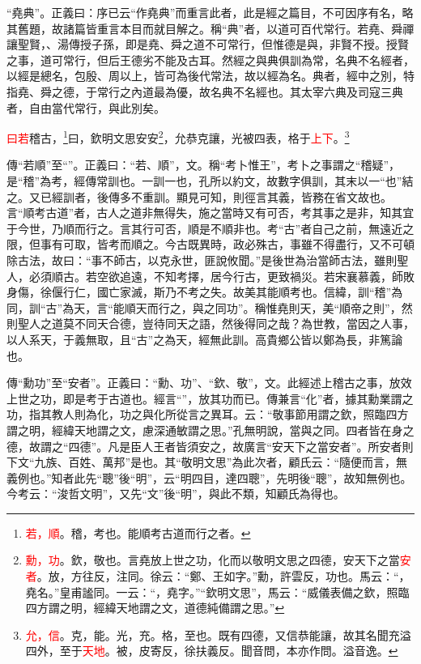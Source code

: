 {\noindent\shu{}\fzkt “堯典”。正義曰：序已云“作堯典”而重言此者，此是經之篇目，不可因序有名，略其舊題，故諸篇皆重言本目而就目解之。稱“典”者，以道可百代常行。若堯、舜禪讓聖賢，、湯傳授子孫，即是堯、舜之道不可常行，但惟德是與，非賢不授。授賢之事，道可常行，但后王德劣不能及古耳。然經之與典俱訓為常，名典不名經者，以經是總名，包殷、周以上，皆可為後代常法，故以經為名。典者，經中之別，特指堯、舜之德，于常行之內道最為優，故名典不名經也。其太宰六典及司寇三典者，自由當代常行，與此別矣。 \par}

\textcolor{red}{曰若}稽古，\footnote{\textcolor{red}{若，順}。稽，考也。能順考古道而行之者\textcolor{red}{}。}曰，欽明文思安安\footnote{\textcolor{red}{勳，功}。欽，敬也。言堯放上世之功，化而以敬明文思之四德，安天下之當\textcolor{red}{安者}。放，方往反，注同。徐云：“鄭、王如字。”勳，許雲反，功也。馬云：“，堯名。”皇甫謐同。一云：“，堯字。”“欽明文思”，馬云：“威儀表備之欽，照臨四方謂之明，經緯天地謂之文，道德純備謂之思。”}，允恭克讓，光被四表，格于\textcolor{red}{上下}。\footnote{\textcolor{red}{允，信}。克，能。光，充。格，至也。既有四德，又信恭能讓，故其名聞充溢四外，至于\textcolor{red}{天地}。被，皮寄反，徐扶義反。聞音問，本亦作問。溢音逸。}

{\noindent\zhuan{}\fzbyks 傳“若順”至“”。正義曰：“若、順”，文。稱“考卜惟王”，考卜之事謂之“稽疑”，是“稽”為考，經傳常訓也。一訓一也，孔所以約文，故數字俱訓，其末以一“也”結之。又已經訓者，後傳多不重訓。顯見可知，則徑言其義，皆務在省文故也。言“順考古道”者，古人之道非無得失，施之當時又有可否，考其事之是非，知其宜于今世，乃順而行之。言其行可否，順是不順非也。考“古”者自己之前，無遠近之限，但事有可取，皆考而順之。今古既異時，政必殊古，事雖不得盡行，又不可頓除古法，故曰：“事不師古，以克永世，匪說攸聞。”是後世為治當師古法，雖則聖人，必須順古。若空欲追遠，不知考擇，居今行古，更致禍災。若宋襄慕義，師敗身傷，徐偃行仁，國亡家滅，斯乃不考之失。故美其能順考也。信緯，訓“稽”為同，訓“古”為天，言“能順天而行之，與之同功”。稱惟堯則天，美“順帝之則”，然則聖人之道莫不同天合德，豈待同天之語，然後得同之哉？為世教，當因之人事，以人系天，于義無取，且“古”之為天，經無此訓。高貴鄉公皆以鄭為長，非篤論也。 \par}

{\noindent\zhuan{}\fzbyks 傳“勳功”至“安者”。正義曰：“勳、功”、“欽、敬”，文。此經述上稽古之事，放效上世之功，即是考于古道也。經言“”，放其功而已。傳兼言“化”者，據其勳業謂之功，指其教人則為化，功之與化所從言之異耳。云：“敬事節用謂之欽，照臨四方謂之明，經緯天地謂之文，慮深通敏謂之思。”孔無明說，當與之同。四者皆在身之德，故謂之“四德”。凡是臣人王者皆須安之，故廣言“安天下之當安者”。所安者則下文“九族、百姓、萬邦”是也。其“敬明文思”為此次者，顧氏云：“隨便而言，無義例也。”知者此先“聰”後“明”，云“明四目，達四聰”，先明後“聰”，故知無例也。今考云：“浚哲文明”，又先“文”後“明”，與此不類，知顧氏為得也。 \par}

